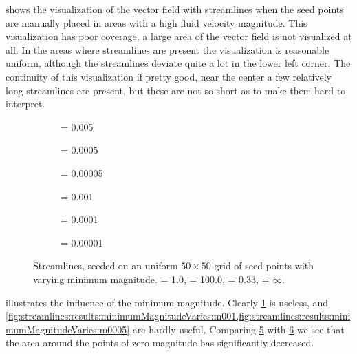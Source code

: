  shows the visualization of the vector field with streamlines when the seed points are manually placed in areas with a high fluid velocity magnitude. This visualization has poor coverage, a large area of the vector field is not visualized at all. In the areas where streamlines are present the visualization is reasonable uniform, although the streamlines deviate quite a lot in the lower left corner. The continuity of this visualization if pretty good, near the center a few relatively long streamlines are present, but these are not so short as to make them hard to interpret.
%
\begin{figure}
	\centering
	\begin{subfigure}{0.32\textwidth}
		\centering
		\caption{\magnitudeMin = 0.005}
		\label{fig:streamlines:results:minimumMagnitudeVaries:m005}
	\end{subfigure}
	\begin{subfigure}{0.32\textwidth}
		\centering
		\caption{\magnitudeMin = 0.0005}
		\label{fig:streamlines:results:minimumMagnitudeVaries:m0005}
	\end{subfigure}	
	\begin{subfigure}{0.32\textwidth}
		\centering
		\caption{\magnitudeMin = 0.00005}
		\label{fig:streamlines:results:minimumMagnitudeVaries:m00005}
	\end{subfigure}	
	\begin{subfigure}{0.32\textwidth}
		\centering
		\caption{\magnitudeMin = 0.001}
		\label{fig:streamlines:results:minimumMagnitudeVaries:m001}
	\end{subfigure}	
	\begin{subfigure}{0.32\textwidth}
		\centering
		\caption{\magnitudeMin = 0.0001}
		\label{fig:streamlines:results:minimumMagnitudeVaries:m0001}
	\end{subfigure}		
	\begin{subfigure}{0.32\textwidth}
		\centering
		\caption{\magnitudeMin = 0.00001}
		\label{fig:streamlines:results:minimumMagnitudeVaries:m00001}
	\end{subfigure}	
	\caption{Streamlines, seeded on an uniform $50 \times 50$ grid of seed points with varying minimum magnitude. \timeStep = 1.0, \timeStepMax = 100.0, \edgeLength = 0.33, \edgeLengthMax = $\infty$.}
	\label{fig:streamlines:results:minimumMagnitudeVaries}
\end{figure}
%
 illustrates the influence of the minimum magnitude. Clearly \cref{fig:streamlines:results:minimumMagnitudeVaries:m005} is useless, and \cref{fig:streamlines:results:minimumMagnitudeVaries:m001,fig:streamlines:results:minimumMagnitudeVaries:m0005} are hardly useful. Comparing \cref{fig:streamlines:results:minimumMagnitudeVaries:m0001} with \cref{fig:streamlines:results:minimumMagnitudeVaries:m00001} we see that the area around the points of zero magnitude has significantly decreased. 

